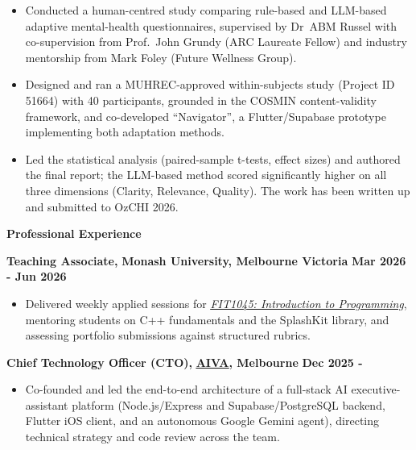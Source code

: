 \documentclass[11pt, a4paper]{article}
\let\hrefnoul\href
\renewcommand{\href}[2]{\hrefnoul{#1}{\ul{#2}}}
\newcommand{\resumesection}[1]{%
  \vspace{6pt}\par
  {\setlength{\fboxsep}{5pt}%
   \noindent\colorbox{sectionbg}{%
     \parbox{\dimexpr\linewidth-10pt\relax}{\strut\textbf{\large #1}\strut}%
   }}%
  \vspace{2pt}\par
}
\begin{document}
\begin{itemize}[leftmargin=1.5em, itemsep=2pt, topsep=1pt, parsep=0pt]
  \item Conducted a human-centred study comparing rule-based and LLM-based adaptive mental-health
        questionnaires, supervised by Dr~ABM Russel with co-supervision from Prof.~John Grundy
        (ARC Laureate Fellow) and industry mentorship from Mark Foley (Future Wellness Group).

  \item Designed and ran a MUHREC-approved within-subjects study (Project ID 51664) with 40
        participants, grounded in the COSMIN content-validity framework, and co-developed
        ``Navigator'', a Flutter/Supabase prototype implementing both adaptation methods.

  \item Led the statistical analysis (paired-sample t-tests, effect sizes) and authored the final
        report; the LLM-based method scored significantly higher on all three dimensions
        (Clarity, Relevance, Quality). The work has been written up and submitted to OzCHI 2026.
\end{itemize}

\resumesection{Professional Experience}

\noindent\textbf{Teaching Associate,} \textbf{Monash University, Melbourne Victoria}%
\hfill\textbf{Mar 2026 - Jun 2026}

\begin{itemize}[leftmargin=1.5em, itemsep=2pt, topsep=1pt, parsep=0pt]
  \item Delivered weekly applied sessions for
        \href{https://handbook.monash.edu/2025/units/fit1045}{\textit{FIT1045: Introduction to Programming}},
        mentoring students on C++ fundamentals and the SplashKit library, and assessing portfolio
        submissions against structured rubrics.
\end{itemize}

\vspace{3pt}
\noindent\textbf{Chief Technology Officer (CTO),}
\href{https://github.com/AIVA-MVP}{\textbf{AIVA}}\textbf{, Melbourne}%
\hfill\textbf{Dec 2025 -}

\begin{itemize}[leftmargin=1.5em, itemsep=2pt, topsep=1pt, parsep=0pt]
  \item Co-founded and led the end-to-end architecture of a full-stack AI executive-assistant
        platform (Node.js/Express and Supabase/PostgreSQL backend, Flutter iOS client, and an
        autonomous Google Gemini agent), directing technical strategy and code review across the team.
\end{itemize}
\end{document}
